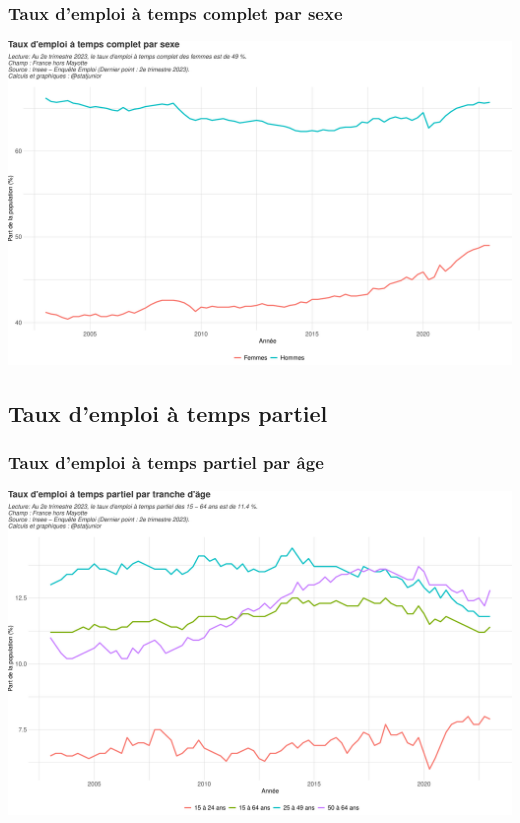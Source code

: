 \documentclass[
  paper=a4,
  ,captions=tableheading
]{scrartcl}
\begin{document}
\hypertarget{taux-demploi-uxe0-temps-complet-par-sexe}{%
\subsubsection{Taux d'emploi à temps complet par
sexe}\label{taux-demploi-uxe0-temps-complet-par-sexe}}

\includegraphics{rapport_activite_emploi_chomage_insee_files/figure-latex/unnamed-chunk-7-1.pdf}

\hypertarget{taux-demploi-uxe0-temps-partiel}{%
\subsection{Taux d'emploi à temps
partiel}\label{taux-demploi-uxe0-temps-partiel}}

\hypertarget{taux-demploi-uxe0-temps-partiel-par-uxe2ge}{%
\subsubsection{Taux d'emploi à temps partiel par
âge}\label{taux-demploi-uxe0-temps-partiel-par-uxe2ge}}

\includegraphics{rapport_activite_emploi_chomage_insee_files/figure-latex/unnamed-chunk-8-1.pdf}
\end{document}
